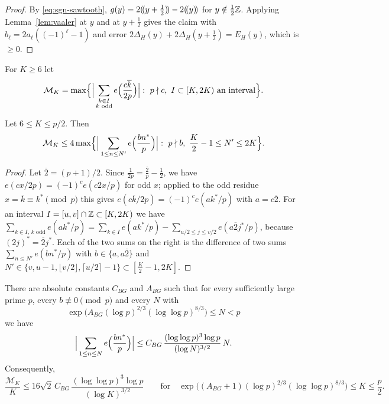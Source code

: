 \begin{proof}
By \eqref{eq:sgn-sawtooth}, $g(y)=2(\!(y+\frac12)\!)-2(\!(y)\!)$ for $y\notin\frac12\mathbb{Z}$. Applying Lemma~\ref{lem:vaaler} at $y$ and at
$y+\frac12$ gives the claim with $b_\ell=2a_\ell((-1)^\ell-1)$ and error $2\Delta_H(y)+2\Delta_H(y+\frac12)=E_H(y)$,
which is $\ge0$.
\end{proof}

For $K\ge6$ let
\[
\mathcal{M}_K=\max\Bigl\{\Big|\sum_{\substack{k\in I\\ k\text{ odd}}}e\Bigl(\frac{c\overline{k}}{2p}\Bigr)\Big|:\ p\nmid c,\
I\subset[K,2K)\text{ an interval}\Bigr\}.
\]

\begin{lemma}\label{lem:reduction}
Let $6\le K\le p/2$. Then
\[
\mathcal{M}_K\le4\max\Bigl\{\Big|\sum_{1\le n\le N'}e\Bigl(\frac{bn^*}{p}\Bigr)\Big|:\ p\nmid b,\ \frac K2-1\le N'\le2K\Bigr\}.
\]
\end{lemma}

\begin{proof}
Let $\overline{2}=(p+1)/2$. Since $\frac1{2p}=\frac{\overline{2}}{p}-\frac12$, we have
$e(cx/2p)=(-1)^ce(c\overline{2}x/p)$ for odd $x$; applied to the odd residue $x=\overline{k}\equiv k^*\pmod p$ this gives
$e(c\overline{k}/2p)=(-1)^ce(ak^*/p)$ with $a=c\overline{2}$. For an interval $I=[u,v]\cap\mathbb{Z}\subset[K,2K)$ we have
$\sum_{k\in I,\,k\text{ odd}}e(ak^*/p)=\sum_{k\in I}e(ak^*/p)-\sum_{u/2\le j\le v/2}e(a\overline{2}j^*/p)$, because
$(2j)^*=\overline{2}j^*$. Each of the two sums on the right is the difference of two sums $\sum_{n\le N'}e(bn^*/p)$ with
$b\in\{a,a\overline{2}\}$ and $N'\in\{v,u-1,\lfloor v/2\rfloor,\lceil u/2\rceil-1\}\subset[\frac K2-1,2K]$.
\end{proof}

\begin{lemma}\label{lem:bourgain-garaev}
There are absolute constants $C_{BG}$ and $A_{BG}$ such that for every sufficiently large prime $p$, every
$b\not\equiv0\pmod p$ and every $N$ with
\[
\exp\bigl(A_{BG}(\log p)^{2/3}(\log\log p)^{8/3}\bigr)\le N<p
\]
we have
\[
\Big|\sum_{1\le n\le N}e\Bigl(\frac{bn^*}{p}\Bigr)\Big|\le C_{BG}\,\frac{(\log\log p)^3\log p}{(\log N)^{3/2}}\,N.
\]
Consequently,
\[
\frac{\mathcal{M}_K}K\le16\sqrt2\,C_{BG}\,\frac{(\log\log p)^3\log p}{(\log K)^{3/2}}\qquad\text{for}\quad
\exp\bigl((A_{BG}+1)(\log p)^{2/3}(\log\log p)^{8/3}\bigr)\le K\le\frac p2.
\]
\end{lemma}

